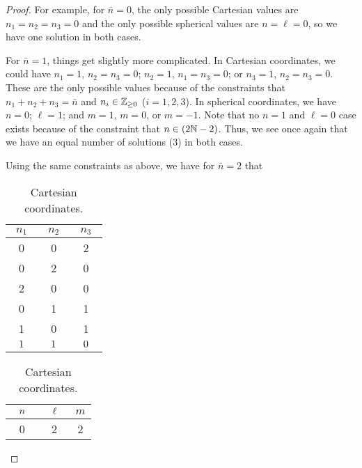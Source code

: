 \documentclass[../psets.tex]{subfiles}
\begin{document}
\begin{enumerate}
\begin{enumerate}
\begin{proof}
            For example, for $\bar{n}=0$, the only possible Cartesian values are $n_1=n_2=n_3=0$ and the only possible spherical values are $n=\ell=0$, so we have one solution in both cases.\par
            For $\bar{n}=1$, things get slightly more complicated. In Cartesian coordinates, we could have $n_1=1$, $n_2=n_3=0$; $n_2=1$, $n_1=n_3=0$; or $n_3=1$, $n_2=n_3=0$. These are the only possible values because of the constraints that $n_1+n_2+n_3=\bar{n}$ and $n_i\in\mathbb{Z}_{\geq 0}$ ($i=1,2,3$). In spherical coordinates, we have $n=0$; $\ell=1$; and $m=1$, $m=0$, or $m=-1$. Note that no $n=1$ and $\ell=0$ case exists because of the constraint that $n\in(2\mathbb{N}-2)$. Thus, we see once again that we have an equal number of solutions (3) in both cases.\par
            Using the same constraints as above, we have for $\bar{n}=2$ that
            \begin{table}[H]
                \centering
                \small
                \renewcommand{\arraystretch}{1.2}
                \begin{subtable}{0.3\linewidth}
                    \centering
                    \begin{tabular}{c|c|c}
                        $n_1$ & $n_2$ & $n_3$\\
                        \hline
                        0 & 0 & 2\\
                        0 & 2 & 0\\
                        2 & 0 & 0\\
                        0 & 1 & 1\\
                        1 & 0 & 1\\
                        ${\color{white}-}1{\color{white}-}$ & ${\color{white}-}1{\color{white}-}$ & ${\color{white}-}0{\color{white}-}$\\
                    \end{tabular}
                    \caption{Cartesian coordinates.}
                \end{subtable}
                \begin{subtable}{0.3\linewidth}
                    \centering
                    \begin{tabular}{c|c|c}
                        ${\color{white}-}n{\color{white}-}$ & ${\color{white}-}\ell{\color{white}-}$ & $m$\\
                        \hline
                        0 & 2 & 2\\

\end{tabular}
\end{subtable}
\end{table}
\end{proof}
\end{enumerate}
\end{enumerate}
\end{document}
